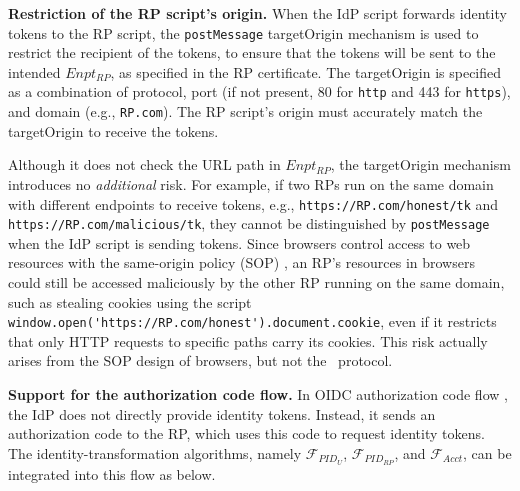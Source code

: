 
\oldc

\noindent \textbf{Restriction of the RP script's origin.}
When the IdP script forwards identity tokens to the RP script, the \verb+postMessage+ targetOrigin mechanism \cite{postm-targeto} is used to restrict the recipient of the tokens, to ensure that the tokens will be sent to the intended $Enpt_{RP}$, as specified in the RP certificate. The targetOrigin is specified as a combination of protocol, port (if not present, 80 for \verb+http+ and 443 for \verb+https+), and domain (e.g., \verb+RP.com+).
The RP script's origin must accurately match the targetOrigin to receive the tokens.

Although it does not check the URL path in $Enpt_{RP}$,
the targetOrigin mechanism introduces no {\em additional} risk.
For example, if two RPs run on the same domain with different endpoints to receive tokens,
 e.g., \verb+https://RP.com/honest/tk+ and \verb+https://RP.com/malicious/tk+,
  they cannot be distinguished by \verb+postMessage+ when the IdP script is sending tokens.
Since browsers control access to web resources with the same-origin policy (SOP) \cite{sop},
   an RP's resources in browsers could still be accessed maliciously by the other RP running on the same domain,
    such as stealing cookies using the script \verb+window.open('https://RP.com/honest').document.cookie+,
even if it restricts that only HTTP requests to specific paths carry its cookies.
 This risk actually arises from the SOP design of browsers, but not the \usso\ protocol.

\noindent \textbf{Support for the authorization code flow.} In OIDC authorization code flow \cite{OpenIDConnect},
 the IdP does not directly provide identity tokens.
 Instead, it sends an authorization code to the RP, which uses this code to request identity tokens.
 The identity-transformation algorithms, namely $\mathcal{F}_{PID_{U}}$, $\mathcal{F}_{PID_{RP}}$, and $\mathcal{F}_{Acct}$,
  can be integrated into this flow as below. %

